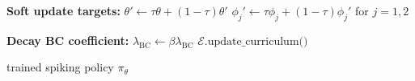 \begin{algorithm}[H]
\begin{algorithmic}[1]
        \State \textbf{Soft update targets:}
        \State $\theta' \leftarrow \tau \theta + (1-\tau)\theta'$
        \State $\phi_j' \leftarrow \tau \phi_j + (1-\tau)\phi_j'$ for $j=1,2$
    \EndFor

    \State \textbf{Decay BC coefficient:} $\lambda_{\text{BC}} \leftarrow \beta \lambda_{\text{BC}}$
        \State $\mathcal{E}.\text{update\_curriculum()}$
    \EndIf
\EndFor

\State \Return trained spiking policy $\pi_\theta$
\end{algorithmic}
\end{algorithm}
